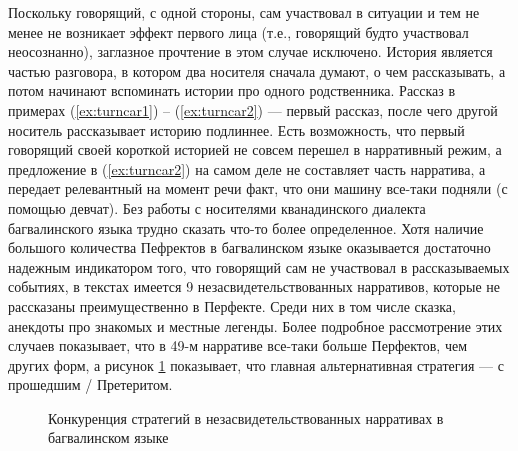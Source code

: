 
Поскольку говорящий, с одной стороны, сам участвовал в ситуации и тем не менее не возникает эффект первого лица (т.е., говорящий будто участвовал неосознанно), заглазное прочтение в этом случае исключено. История является частью разговора, в котором два носителя сначала думают, о чем рассказывать, а потом начинают вспоминать истории про одного родственника. Рассказ в примерах (\ref{ex:turncar1}) -- (\ref{ex:turncar2}) --- первый рассказ, после чего другой носитель рассказывает историю подлиннее. Есть возможность, что первый говорящий своей короткой историей не совсем перешел в нарративный режим, а предложение в (\ref{ex:turncar2}) на самом деле не составляет часть нарратива, а передает релевантный на момент речи факт, что они машину все-таки подняли (с помощью девчат). Без работы с носителями кванадинского диалекта багвалинского языка трудно сказать что-то более определенное. Хотя наличие большого количества Пефректов в багвалинском языке оказывается достаточно надежным индикатором того, что говорящий сам не участвовал в рассказываемых событиях, в текстах имеется 9 незасвидетельствованных нарративов, которые не рассказаны преимущественно в Перфекте. Среди них в том числе сказка, анекдоты про знакомых и местные легенды. Более подробное рассмотрение этих случаев показывает, что в 49-м нарративе все-таки больше Перфектов, чем других форм, а рисунок \ref{fig:bagvindir} показывает, что главная альтернативная стратегия --- с прошедшим / Претеритом. 

\begin{figure}[h]
\centering
\caption{Конкуренция стратегий в незасвидетельствованных нарративах в багвалинском языке}
\label{fig:bagvindir}
\vspace{0.5cm}
\end{figure}

